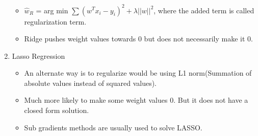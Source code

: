 \documentclass[a4paper]{article}
\begin{document}
\begin{enumerate}
    \begin{itemize}
        \item $\hat{w}_R$ = arg min $\sum(w^Tx_i - y_i)^2 + \lambda||w||^2$, where the added term is called regularization term.
        \item Ridge pushes weight values towards 0 but does not necessarily make it 0.
    \end{itemize}
    \item Lasso Regression
    \begin{itemize}
        \item An alternate way is to regularize would be using L1 norm(Summation of absolute values instead of squared values).
        \item Much more likely to make some weight values 0. But it does not have a closed form solution.
        \item Sub gradients methods are usually used to solve LASSO.
    \end{itemize}
\end{enumerate}
\end{document}
